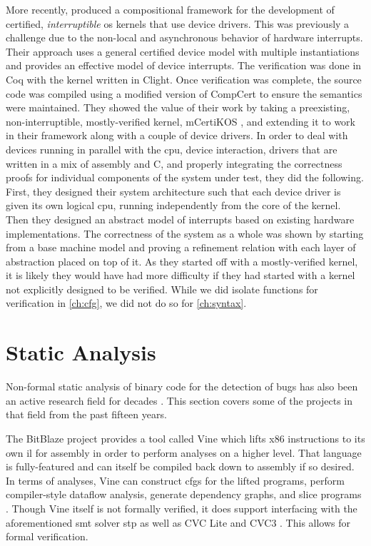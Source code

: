 More recently, \textcite{chen2018compositional} produced a compositional framework
for the development of certified, \emph{interruptible}%
\ac{os} kernels that use device drivers.%
This was previously a challenge due to the non-local and asynchronous behavior
of hardware interrupts. Their approach uses a general certified device model
with multiple instantiations and provides an effective model of device interrupts.
The verification was done in Coq with the kernel written in Clight.
Once verification was complete, the source code was compiled using a modified version
of CompCert to ensure the semantics were maintained.
They showed the value of their work by taking a preexisting,
non-interruptible, mostly-verified kernel, mCertiKOS \autocite{costanzo2016endtoend},
and extending it to work in their framework along with a couple of device drivers.
In order to deal with devices running in parallel with the \ac{cpu},
device interaction, drivers that are written in a mix of assembly and C,
and properly integrating the correctness proofs for individual components
of the system under test, they did the following.
First, they designed their system architecture such that each device driver
is given its own logical \ac{cpu}, running independently from the core of the kernel.
Then they designed an abstract model of interrupts
based on existing hardware implementations.
The correctness of the system as a whole was shown
by starting from a base machine model
and proving a refinement relation with each layer of abstraction placed on top of it.
As they started off with a mostly-verified kernel, it is likely they would have had
more difficulty if they had started with a kernel
not explicitly designed to be verified. While we did isolate functions
for verification in \cref{ch:cfg}, we did not do so for \cref{ch:syntax}.

\section{Static Analysis}\label{se:static_analysis}
Non-formal static analysis of binary code for the detection of bugs
has also been an active research field for decades
\autocite{kruegel2005automating,brumley2011bap,wang2017angr}.
This section covers some of the projects in that field from the past fifteen years.

The BitBlaze project \autocite{song2008bitblaze,BitBlazeWebSite}
provides a tool called Vine which lifts x86 instructions to its own \ac{il} for assembly
in order to perform analyses on a higher level.
That language is fully-featured and can itself be compiled back down to assembly
if so desired.
In terms of analyses, Vine can construct \acp{cfg} for the lifted programs,
perform compiler-style dataflow analysis, generate dependency graphs,
and slice programs \autocite{weiser1981slicing,tip1995survey}.
Though Vine itself is not formally verified,
it does support interfacing with the aforementioned \ac{smt} solver \ac{stp}
as well as CVC Lite \autocite{barrett2004cvcl} and CVC3 \autocite{barrett2007cvc3}.
This allows for formal verification.

